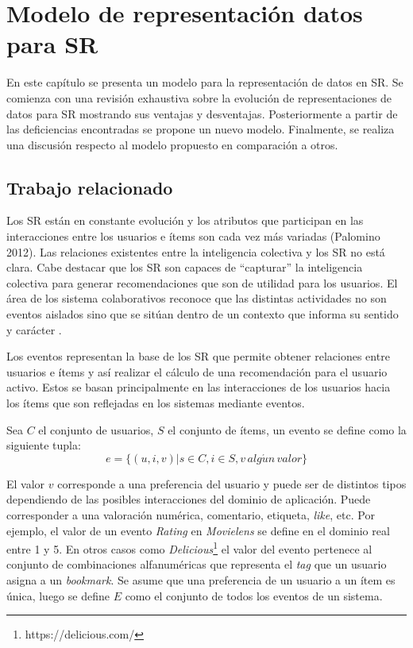 \chapter{Modelo de representación datos para SR}
\label{capitulo:modelo}

En este capítulo se presenta un modelo para la representación de datos en SR. Se comienza con una revisión exhaustiva sobre la evolución de representaciones de datos para SR mostrando sus ventajas y desventajas. Posteriormente a partir de las deficiencias encontradas se propone un nuevo modelo. Finalmente, se realiza una discusión respecto al modelo propuesto en comparación a otros.

\section{Trabajo relacionado}
\label{modelo:trabajorelacionado}

Los SR están en constante evolución y los atributos que participan en las interacciones entre los usuarios e ítems son cada vez más variadas (Palomino 2012). Las relaciones existentes entre la inteligencia colectiva y los SR no está clara. Cabe destacar que los SR son capaces de “capturar” la inteligencia colectiva para generar recomendaciones que son de utilidad para los usuarios. El área de los sistema colaborativos reconoce que las distintas actividades no son eventos aislados sino que se sitúan dentro de un contexto que informa su sentido y carácter \citep{Suchman:1987}.

Los eventos representan la base de los SR que permite obtener relaciones entre usuarios e ítems y así realizar el cálculo de una recomendación para el usuario activo. Estos se basan principalmente en las interacciones de los usuarios hacia los ítems que son reflejadas en los sistemas mediante eventos.

Sea $C$ el conjunto de usuarios, $S$ el conjunto de ítems, un evento se define como la siguiente tupla:
\begin{equation}
\label{def:evento}
	e = \{ (u,i,v) | s \in C, i \in S, v\, alg\acute{u}n\, valor  \}
\end{equation}



El valor $v$ corresponde a una preferencia del usuario y puede ser de distintos tipos dependiendo de las posibles interacciones del dominio de aplicación. Puede corresponder a una valoración numérica,  comentario, etiqueta, \textit{like}, etc. Por ejemplo, el valor de un evento \textit{Rating} en \textit{Movielens} se define en el dominio real entre 1 y 5. En otros casos como \textit{Delicious}\footnote{https://delicious.com/} el valor del evento pertenece al conjunto de combinaciones alfanuméricas que representa el \textit{tag} que un usuario asigna a un \textit{bookmark}. Se asume que una preferencia de un usuario a un ítem es única, luego se define $E$ como el conjunto de todos los eventos de un sistema.

